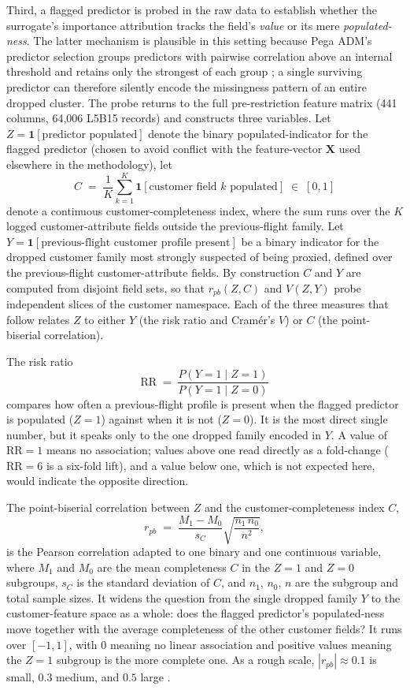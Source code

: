 \documentclass[oneside]{memoir} %
\begin{document}
Third, a flagged predictor is probed in the raw data to establish whether the surrogate's importance attribution tracks the field's \emph{value} or its mere \emph{populated-ness}. The latter mechanism is plausible in this setting because Pega ADM's predictor selection groups predictors with pairwise correlation above an internal threshold and retains only the strongest of each group \parencite{pegasystems_predictors_2020}; a single surviving predictor can therefore silently encode the missingness pattern of an entire dropped cluster. The probe returns to the full pre-restriction feature matrix (441 columns, 64{,}006 L5B15 records) and constructs three variables. Let $Z = \mathbf{1}[\text{predictor populated}]$ denote the binary populated-indicator for the flagged predictor (chosen to avoid conflict with the feature-vector $\mathbf{X}$ used elsewhere in the methodology), let
\[
C \;=\; \frac{1}{K}\sum_{k=1}^{K} \mathbf{1}[\text{customer field } k \text{ populated}] \;\in\; [0, 1]
\]
denote a continuous customer-completeness index, where the sum runs over the $K$ logged customer-attribute fields outside the previous-flight family. Let $Y = \mathbf{1}[\text{previous-flight customer profile present}]$ be a binary indicator for the dropped customer family most strongly suspected of being proxied, defined over the previous-flight customer-attribute fields. By construction $C$ and $Y$ are computed from disjoint field sets, so that $r_{pb}(Z, C)$ and $V(Z, Y)$ probe independent slices of the customer namespace. Each of the three measures that follow relates $Z$ to either $Y$ (the risk ratio and Cram\'er's $V$) or $C$ (the point-biserial correlation).

The risk ratio
\[
\mathrm{RR} \;=\; \frac{P(Y = 1 \mid Z = 1)}{P(Y = 1 \mid Z = 0)}
\]
compares how often a previous-flight profile is present when the flagged predictor is populated ($Z = 1$) against when it is not ($Z = 0$). It is the most direct single number, but it speaks only to the one dropped family encoded in $Y$. A value of $\mathrm{RR} = 1$ means no association; values above one read directly as a fold-change ($\mathrm{RR} = 6$ is a six-fold lift), and a value below one, which is not expected here, would indicate the opposite direction.

The point-biserial correlation between $Z$ and the customer-completeness index $C$,
\[
r_{pb} \;=\; \frac{M_1 - M_0}{s_C} \sqrt{\frac{n_1 \, n_0}{n^{2}}},
\]
is the Pearson correlation adapted to one binary and one continuous variable, where $M_1$ and $M_0$ are the mean completeness $C$ in the $Z = 1$ and $Z = 0$ subgroups, $s_C$ is the standard deviation of $C$, and $n_1$, $n_0$, $n$ are the subgroup and total sample sizes. It widens the question from the single dropped family $Y$ to the customer-feature space as a whole: does the flagged predictor's populated-ness move together with the average completeness of the other customer fields? It runs over $[-1, 1]$, with $0$ meaning no linear association and positive values meaning the $Z = 1$ subgroup is the more complete one. As a rough scale, $|r_{pb}| \approx 0.1$ is small, $0.3$ medium, and $0.5$ large \parencite{cohen_statistical_2009}.
\end{document}
